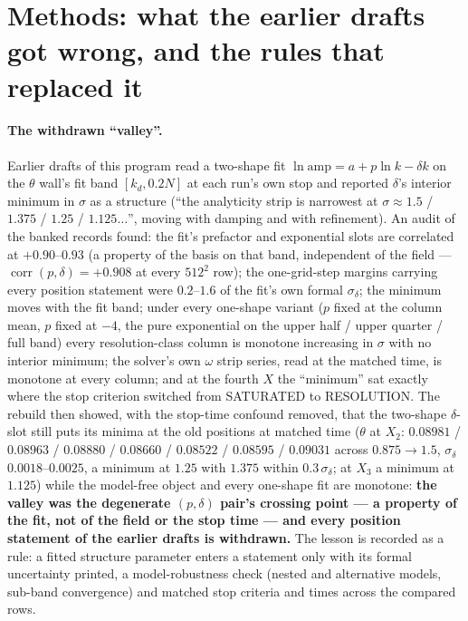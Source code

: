 \documentclass[11pt,a4paper]{article}
\newcommand{\kd}{k_d}
\begin{document}
\section{Methods: what the earlier drafts got wrong, and the rules that replaced it}\label{sec:methods}

\paragraph{The withdrawn ``valley''.} Earlier drafts of this program read a two-shape fit $\ln\mathrm{amp}=a+p\ln k-\delta k$ on the $\theta$ wall's fit band $[\kd,0.2N]$ at each run's own stop and reported $\delta$'s interior minimum in $\sigma$ as a structure (``the analyticity strip is narrowest at $\sigma\approx1.5$ / $1.375$ / $1.25$ / $1.125\dots$'', moving with damping and with refinement). An audit of the banked records found: the fit's prefactor and exponential slots are correlated at $+0.90$--$0.93$ (a property of the basis on that band, independent of the field --- $\operatorname{corr}(p,\delta)=+0.908$ at every $512^2$ row); the one-grid-step margins carrying every position statement were $0.2$--$1.6$ of the fit's own formal $\sigma_\delta$; the minimum moves with the fit band; under every one-shape variant ($p$ fixed at the column mean, $p$ fixed at $-4$, the pure exponential on the upper half / upper quarter / full band) every resolution-class column is monotone increasing in $\sigma$ with no interior minimum; the solver's own $\omega$ strip series, read at the matched time, is monotone at every column; and at the fourth $X$ the ``minimum'' sat exactly where the stop criterion switched from SATURATED to RESOLUTION. The rebuild then showed, with the stop-time confound removed, that the two-shape $\delta$-slot still puts its minima at the old positions at matched time ($\theta$ at $X_2$: $0.08981$ / $0.08963$ / $0.08880$ / $0.08660$ / $0.08522$ / $0.08595$ / $0.09031$ across $0.875\to1.5$, $\sigma_\delta$ $0.0018$--$0.0025$, a minimum at $1.25$ with $1.375$ within $0.3\,\sigma_\delta$; at $X_3$ a minimum at $1.125$) while the model-free object and every one-shape fit are monotone: \textbf{the valley was the degenerate $(p,\delta)$ pair's crossing point --- a property of the fit, not of the field or the stop time --- and every position statement of the earlier drafts is withdrawn.} The lesson is recorded as a rule: a fitted structure parameter enters a statement only with its formal uncertainty printed, a model-robustness check (nested and alternative models, sub-band convergence) and matched stop criteria and times across the compared rows.
\end{document}
